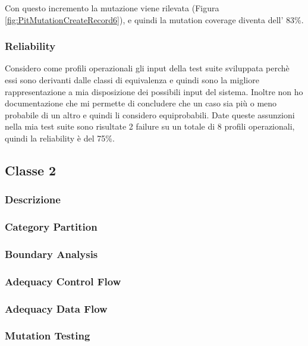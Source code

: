 \documentclass[12pt, a4paper]{article}
\begin{document}
Con questo incremento la mutazione viene rilevata (Figura \ref{fig:PitMutationCreateRecord6}), e quindi 
la mutation coverage diventa dell' 83\%. 

\subsubsection{Reliability}
Considero come profili operazionali gli input della test suite sviluppata perchè essi sono derivanti dalle classi di equivalenza
e quindi sono la migliore rappresentazione a mia disposizione dei possibili input del sistema. Inoltre non ho documentazione che
mi permette di concludere che un caso sia più o meno probabile di un altro e quindi li considero equiprobabili. Date queste 
assunzioni nella mia test suite sono risultate 2 failure su un totale di 8 profili operazionali, quindi la reliability è del 75\%.


\subsection{Classe 2}
\subsubsection{Descrizione}
\subsubsection{Category Partition}
\subsubsection{Boundary Analysis}
\subsubsection{Adequacy Control Flow}
\subsubsection{Adequacy Data Flow}
\subsubsection{Mutation Testing}
\end{document}
